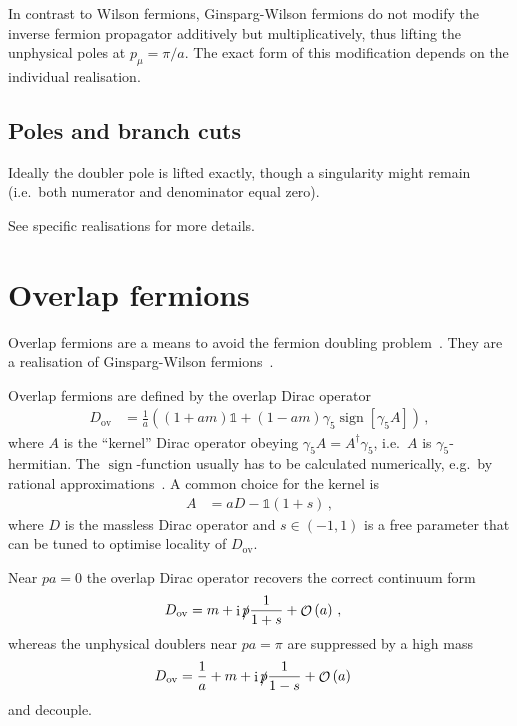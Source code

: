 \documentclass[a4paper]{article}
\DeclareMathOperator{\im}{i}
\DeclareMathOperator{\sign}{sign}
\DeclareMathOperator{\ord}{\mathcal{O}}
\newcommand{\ordnung}[1]{\ensuremath{\ord\left(#1\right)}}
\begin{document}
	In contrast to Wilson fermions, Ginsparg-Wilson fermions do not modify the inverse fermion propagator additively but multiplicatively, thus lifting the unphysical poles at $p_\mu = \pi/a$. The exact form of this modification depends on the individual realisation.
	
	\subsection{Poles and branch cuts}
	Ideally the doubler pole is lifted exactly, though a singularity might remain (i.e.\ both numerator and denominator equal zero).
	
	See specific realisations for more details.
	
	\section{Overlap fermions}
	Overlap fermions are a means to avoid the fermion doubling problem~\cite{overlap_1998,Gattringer:2010zz}. They are a realisation of Ginsparg-Wilson fermions~\cite{Ginsparg_Wilson}.
	
	Overlap fermions are defined by the overlap Dirac operator
	\begin{align}
		D_{\text{ov}} &= \frac1a \left(\left(1+am\right)\mathds 1 + \left(1-am\right)\gamma_5\sign[\gamma_5 A]\right)\,,
	\end{align}
	where $A$ is the ``kernel'' Dirac operator obeying $\gamma_5 A = A^\dagger\gamma_5$, i.e.\ $A$ is $\gamma_5$-hermitian. The $\sign$-function usually has to be calculated numerically, e.g.\ by rational approximations~\cite{kennedy2012algorithms}. A common choice for the kernel is
	\begin{align}
		A &= aD - \mathds 1(1+s)\,,
	\end{align}
	where $D$ is the massless Dirac operator and $s\in\left(-1,1\right)$ is a free parameter that can be tuned to optimise locality of $D_\text{ov}$.
	
	Near $pa=0$ the overlap Dirac operator recovers the correct continuum form
	\begin{align}
		D_\text{ov} &= m+\im\slashed p\frac{1}{1+s}+\ordnung{a}\,,
	\end{align}
	whereas the unphysical doublers near $pa=\pi$ are suppressed by a high mass
	\begin{align}
		D_\text{ov} &= \frac1a+m+\im\slashed p\frac{1}{1-s}+\ordnung{a}
	\end{align}
	and decouple.
	
\end{document}
